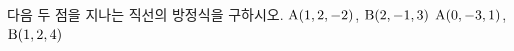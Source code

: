 다음 두 점을 지나는 직선의 방정식을 구하시오.
 $\mathrm{A}(1{,}\mkern3mu\mathopen{}2{,}\mkern3mu\mathopen{}-2)$, $\mathrm{B}(2{,}\mkern3mu\mathopen{}-1{,}\mkern3mu\mathopen{}3)$
 $\mathrm{A}(0{,}\mkern3mu\mathopen{}-3{,}\mkern3mu\mathopen{}1)$, $\mathrm{B}(1{,}\mkern3mu\mathopen{}2{,}\mkern3mu\mathopen{}4)$
